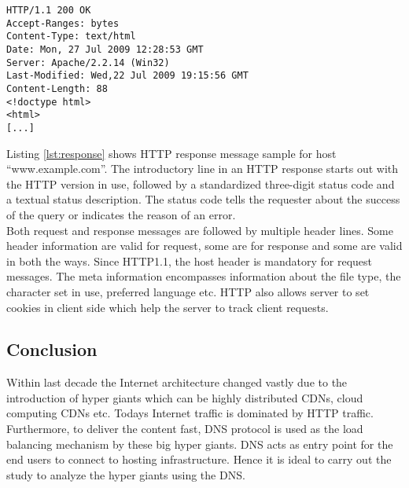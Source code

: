 \begin{lstlisting}[caption= HTTP Response message, label=lst:response]
HTTP/1.1 200 OK
Accept-Ranges: bytes
Content-Type: text/html
Date: Mon, 27 Jul 2009 12:28:53 GMT
Server: Apache/2.2.14 (Win32)
Last-Modified: Wed,22 Jul 2009 19:15:56 GMT
Content-Length: 88
<!doctype html>
<html>
[...] 
\end{lstlisting}

\noindent Listing \ref{lst:response} shows HTTP response message sample for host \enquote{www.example.com}. The introductory line in an HTTP response starts out with the HTTP version in use, followed by a standardized three-digit status code and a textual status description. The status code tells the requester about the success of the query or indicates the reason of an error. \\

\noindent Both request and response messages are followed by multiple header lines. Some header information are valid for request, some are for response and some are valid in both the ways. Since HTTP1.1, the host header is mandatory for request messages. The meta information encompasses information about the file type, the character set in use, preferred language etc. HTTP also allows server to set cookies in client side which help the server to track client requests.\\

\subsection{Conclusion}
\noindent Within last decade the Internet architecture changed vastly due to the introduction of hyper giants which can be highly distributed CDNs, cloud computing
CDNs etc. Todays Internet traffic is dominated by HTTP traffic. Furthermore, to deliver
the content fast, DNS protocol is used as the load balancing mechanism by these
big hyper giants. DNS  acts as entry point for the end users to connect to hosting infrastructure. Hence it is ideal to carry out the study to analyze the hyper giants using the DNS.
\clearpage